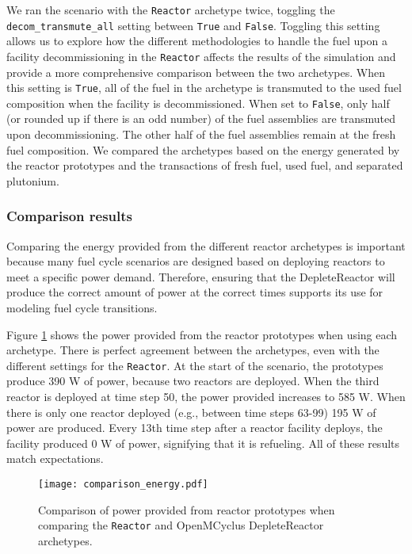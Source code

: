 We ran the scenario with the \Cycamore \texttt{Reactor} archetype twice, 
toggling the \texttt{decom\_transmute\_all} setting between \texttt{True}
and \texttt{False}. Toggling this setting allows us to explore how the 
different methodologies to handle the fuel upon a facility 
decommissioning in the \Cycamore \texttt{Reactor} affects the results of 
the simulation and provide a more comprehensive comparison between the 
two archetypes. When this setting is \texttt{True}, all of the 
fuel in the archetype is transmuted to the used fuel composition 
when the facility is decommissioned. When set to \texttt{False}, 
only half (or rounded up if there is an odd number) of the fuel 
assemblies are transmuted upon decommissioning. The other half 
of the fuel assemblies remain at the fresh fuel composition. 
We compared the archetypes based on the energy generated 
by the reactor prototypes and the transactions of fresh fuel, used fuel, 
and separated plutonium. 

\subsubsection{Comparison results}
Comparing the energy provided from the different reactor archetypes is 
important because many 
fuel cycle scenarios are designed based on deploying reactors to meet a 
specific power demand. Therefore, ensuring that the DepleteReactor 
will produce the correct amount of power at the correct times 
supports its use for modeling fuel cycle transitions. 

Figure \ref{fig:comparison_power} shows the power provided from the
reactor prototypes when using each archetype.
There is perfect agreement between the archetypes, even with the different 
settings for the \Cycamore \texttt{Reactor}. At the start of the scenario, 
the prototypes produce 390 W of power, because two reactors are 
deployed. When the third reactor is deployed at time step 50, 
the power provided increases to 585 W. When there is only one  
reactor deployed (e.g., between time steps 63-99) 195 W of power 
are produced. Every 13th time step after a reactor facility deploys, 
the facility produced 0 W of power, signifying that it is refueling.
All of these results match expectations. 

\begin{figure}[ht]
    \centering 
    \texttt{[image: comparison\_energy.pdf]}
    \caption{Comparison of power provided from reactor prototypes 
    when comparing the \Cycamore \texttt{Reactor} and OpenMCyclus 
    DepleteReactor archetypes.}
    \label{fig:comparison_power}
\end{figure}

